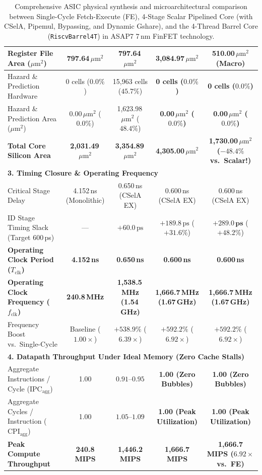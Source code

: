 \begin{table}[htbp]
{\begin{tabular}{|l|c|c|c|c|}
Register File Area ($\mu\text{m}^2$) & 797.64\,$\mu\text{m}^2$ & 797.64\,$\mu\text{m}^2$ & 3,084.97\,$\mu\text{m}^2$ & \textbf{510.00\,$\mu\text{m}^2$ (Macro)} \\ \hline
Hazard \& Prediction Hardware & 0 cells ($0.0\%$) & 15,963 cells ($45.7\%$) & \textbf{0 cells ($0.0\%$)} & \textbf{0 cells ($0.0\%$)} \\ \hline
Hazard \& Prediction Area ($\mu\text{m}^2$) & 0.00\,$\mu\text{m}^2$ ($0.0\%$) & 1,623.98\,$\mu\text{m}^2$ ($48.4\%$) & \textbf{0.00\,$\mu\text{m}^2$ ($0.0\%$)} & \textbf{0.00\,$\mu\text{m}^2$ ($0.0\%$)} \\ \hline
\textbf{Total Core Silicon Area} & \textbf{2,031.49\,$\mu\text{m}^2$} & \textbf{3,354.89\,$\mu\text{m}^2$} & \textbf{4,305.00\,$\mu\text{m}^2$} & \textbf{1,730.00\,$\mu\text{m}^2$ ($-48.4\%$ vs.\ Scalar!)} \\ \hline
\hline
\multicolumn{5}{|l|}{\textbf{3. Timing Closure \& Operating Frequency}} \\ \hline
Critical Stage Delay & 4.152\,ns (Monolithic) & 0.650\,ns (CSelA EX) & 0.600\,ns (CSelA EX) & 0.600\,ns (CSelA EX) \\ \hline
ID Stage Timing Slack (Target 600\,ps) & --- & $+60.0\,\text{ps}$ & $+189.8\,\text{ps}$ ($+31.6\%$) & $\mathbf{+289.0\,\text{ps}}$ ($\mathbf{+48.2\%}$) \\ \hline
\textbf{Operating Clock Period ($T_{\text{clk}}$)} & \textbf{4.152\,ns} & \textbf{0.650\,ns} & \textbf{0.600\,ns} & \textbf{0.600\,ns} \\ \hline
\textbf{Operating Clock Frequency ($f_{\text{clk}}$)} & \textbf{240.8\,MHz} & \textbf{1,538.5\,MHz (1.54\,GHz)} & \textbf{1,666.7\,MHz (1.67\,GHz)} & \textbf{1,666.7\,MHz (1.67\,GHz)} \\ \hline
Frequency Boost vs.\ Single-Cycle & Baseline ($1.00\times$) & $+538.9\%$ ($6.39\times$) & $\mathbf{+592.2\%}$ ($\mathbf{6.92\times}$) & $\mathbf{+592.2\%}$ ($\mathbf{6.92\times}$) \\ \hline
\hline
\multicolumn{5}{|l|}{\textbf{4. Datapath Throughput Under Ideal Memory (Zero Cache Stalls)}} \\ \hline
Aggregate Instructions / Cycle ($\text{IPC}_{\text{agg}}$) & 1.00 & $0.91\text{--}0.95$ & \textbf{1.00 (Zero Bubbles)} & \textbf{1.00 (Zero Bubbles)} \\ \hline
Aggregate Cycles / Instruction ($\text{CPI}_{\text{agg}}$) & 1.00 & $1.05\text{--}1.09$ & \textbf{1.00 (Peak Utilization)} & \textbf{1.00 (Peak Utilization)} \\ \hline
\textbf{Peak Compute Throughput} & \textbf{240.8 MIPS} & \textbf{1,446.2 MIPS} & \textbf{1,666.7 MIPS} & \textbf{1,666.7 MIPS ($\mathbf{6.92\times}$ vs.\ FE)} \\ \hline
\end{tabular}%
}
\caption{Comprehensive ASIC physical synthesis and microarchitectural comparison between Single-Cycle Fetch-Execute (FE), 4-Stage Scalar Pipelined Core (with CSelA, Pipemul, Bypassing, and Dynamic Gshare), and the 4-Thread Barrel Core (\texttt{RiscvBarrel4T}) in ASAP7 7\,nm FinFET technology.}\label{tab:asap7_4t_grand_synthesis}
\end{table}

